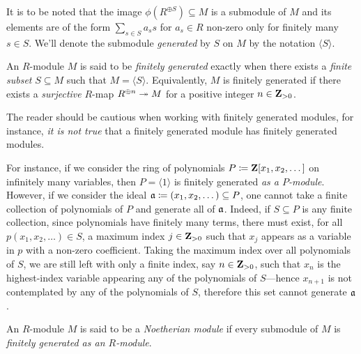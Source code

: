 It is to be noted that the image \(\phi(R^{\oplus S}) \subseteq M\) is a
submodule of \(M\) and its elements are of the form \(\sum_{s \in S} a_s s\) for
\(a_s \in R\) non-zero only for finitely many \(s \in S\). We'll denote the
submodule \emph{generated} by \(S\) on \(M\) by the notation
\(\langle S \rangle\).


\begin{definition}
\label{def:finitely-generated-module}
An \(R\)-module \(M\) is said to be \emph{finitely generated} exactly when there
exists a \emph{finite subset} \(S \subseteq M\) such that
\(M = \langle S \rangle\). Equivalently, \(M\) is finitely generated if there
exists a \emph{surjective} \(R\)-map \(R^{\oplus n} \twoheadrightarrow M\) for a positive
integer \(n \in \mathbf{Z}_{>0}\).
\end{definition}

\begin{remark}[Submodules]
\label{rem:submodules-finitely-generated}
The reader should be cautious when working with finitely generated modules, for
instance, \emph{it is not true} that a finitely generated module has finitely
generated modules.

For instance, if we consider the ring of polynomials
\(P \coloneq \mathbf{Z}[x_1, x_2, \dots]\) on infinitely many variables, then
\(P = \langle 1 \rangle\) is finitely generated \emph{as a
  \(P\)-module}. However, if we consider the ideal
\(\mathfrak{a} \coloneq (x_1, x_2, \dots) \subseteq P\), one cannot take a finite
collection of polynomials of \(P\) and generate all of \(\mathfrak{a}\). Indeed, if
\(S \subseteq P\) is any finite collection, since polynomials have finitely many
terms, there must exist, for all \(p(x_1, x_2, \dots) \in S\), a maximum index
\(j \in \mathbf{Z}_{>0}\) such that \(x_j\) appears as a variable in \(p\) with a
non-zero coefficient. Taking the maximum index over all polynomials of \(S\), we
are still left with only a finite index, say \(n \in \mathbf{Z}_{>0}\), such that
\(x_n\) is the highest-index variable appearing any of the polynomials of
\(S\)---hence \(x_{n+1}\) is not contemplated by any of the polynomials of
\(S\), therefore this set cannot generate \(\mathfrak{a}\).
\end{remark}

\begin{definition}
\label{def:noetherian-module}
An \(R\)-module \(M\) is said to be a \emph{Noetherian module} if every
submodule of \(M\) is \emph{finitely generated as an \(R\)-module}.
\end{definition}

